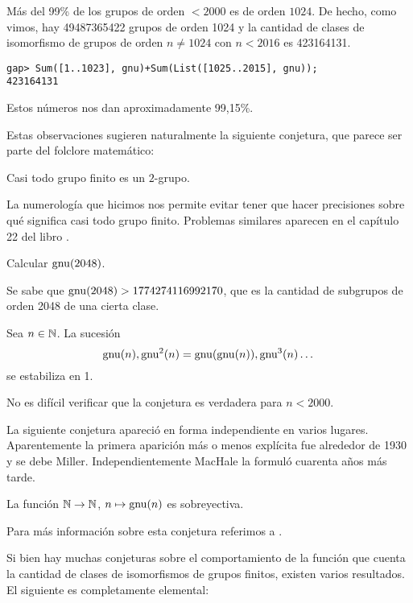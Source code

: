 Más del 99\% de los grupos de orden $<2000$ es de orden $1024$. 
De hecho, como vimos, hay 49487365422 grupos de orden 1024 y la cantidad de clases de isomorfismo 
de grupos de orden $n\ne1024$ con $n<2016$ es 423164131. 

\begin{lstlisting}
gap> Sum([1..1023], gnu)+Sum(List([1025..2015], gnu));
423164131
\end{lstlisting}

Estos números nos dan aproximadamente 99,15\%. 

Estas observaciones sugieren naturalmente la siguiente conjetura,
que parece ser parte del folclore matemático:

\begin{conjecture}
Casi todo grupo finito es un $2$-grupo. 
\end{conjecture}

La numerología que hicimos nos permite evitar tener que hacer precisiones sobre 
qué significa \guillemotleft casi todo grupo finito\guillemotright. Problemas
similares aparecen en el capítulo 22 del libro \cite{MR2382539}.

\begin{problem}
Calcular $\operatorname{gnu}(2048)$. 
\end{problem}

Se sabe que $\operatorname{gnu}(2048)>1774274116992170$, que es la cantidad de subgrupos de orden 2048 
de una cierta clase. 

\begin{conjecture}
Sea $n\in\mathbb{N}$. La sucesión
\[
\operatorname{gnu}(n),\operatorname{gnu}^2(n)=\operatorname{gnu}(\operatorname{gnu}(n)),\operatorname{gnu}^3(n)\dots
\]
se estabiliza en 1. 
\end{conjecture}

No es difícil verificar que la conjetura es verdadera para $n<2000$.

La siguiente conjetura apareció en forma independiente en varios lugares. 
Aparentemente la primera aparición más o menos explícita 
fue alrededor de 1930 y se debe Miller. 
Independientemente MacHale la formuló cuarenta años más tarde. 

\begin{conjecture}
La función $\mathbb{N}\to\mathbb{N}$, $n\mapsto\operatorname{gnu}(n)$ es sobreyectiva. 
\end{conjecture}

Para más información sobre esta conjetura referimos a \cite[\S21.6]{MR2382539}.

Si bien hay muchas conjeturas sobre el comportamiento de la función que cuenta la cantidad de 
clases de isomorfismos de grupos finitos, existen varios 
resultados. El siguiente es completamente elemental:

